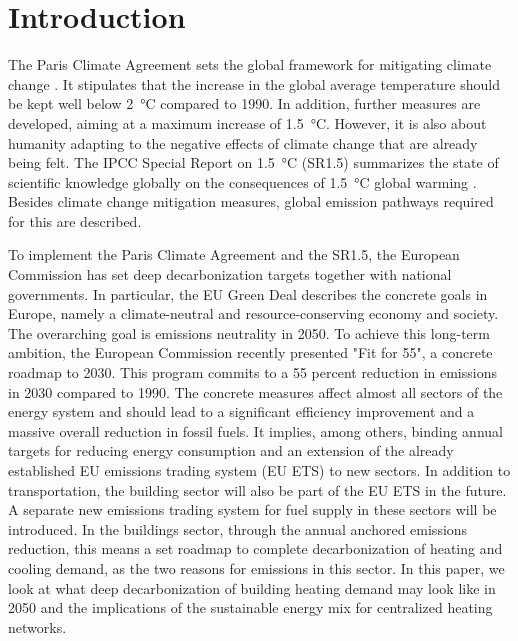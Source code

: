 \section{Introduction}
The Paris Climate Agreement sets the global framework for mitigating climate change \cite{agreement2015paris}. It stipulates that the increase in the global average temperature should be kept well below \SI{2}{\degreeCelsius} compared to 1990. In addition, further measures are developed, aiming at a maximum increase of \SI{1.5}{\degreeCelsius}. However, it is also about humanity adapting to the negative effects of climate change that are already being felt. The IPCC Special Report on \SI{1.5}{\degreeCelsius} (SR1.5) summarizes the state of scientific knowledge globally on the consequences of \SI{1.5}{\degreeCelsius} global warming \cite{edenhofer2011ipcc}. Besides climate change mitigation measures, global emission pathways required for this are described.\vspace{0.3cm}

To implement the Paris Climate Agreement and the SR1.5, the European Commission has set deep decarbonization targets together with national governments. In particular, the EU Green Deal describes the concrete goals in Europe, namely a climate-neutral and resource-conserving economy and society. The overarching goal is emissions neutrality in 2050. To achieve this long-term ambition, the European Commission recently presented "Fit for 55", a concrete roadmap to 2030. This program commits to a 55 percent reduction in emissions in 2030 compared to 1990. The concrete measures affect almost all sectors of the energy system and should lead to a significant efficiency improvement and a massive overall reduction in fossil fuels. It implies, among others, binding annual targets for reducing energy consumption and an extension of the already established EU emissions trading system (EU ETS) to new sectors. In addition to transportation, the building sector will also be part of the EU ETS in the future. A separate new emissions trading system for fuel supply in these sectors will be introduced. In the buildings sector, through the annual anchored emissions reduction, this means a set roadmap to complete decarbonization of heating and cooling demand, as the two reasons for emissions in this sector. In this paper, we look at what deep decarbonization of building heating demand may look like in 2050 and the implications of the sustainable energy mix for centralized heating networks.\vspace{0.3cm}

